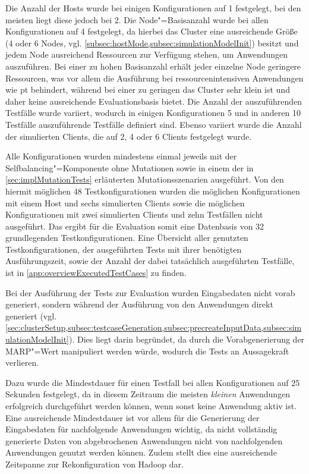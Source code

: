Die Anzahl der Hosts wurde bei einigen Konfigurationen auf 1 festgelegt, bei den meisten liegt diese jedoch bei 2.
Die Node"=Basisanzahl wurde bei allen Konfigurationen auf 4 festgelegt, da hierbei das Cluster eine ausreichende Größe (4 oder 6 Nodes, vgl. \cref{subsec:hostMode,subsec:simulationModelInit}) besitzt und jedem Node ausreichend Ressourcen zur Verfügung stehen, um Anwendungen auszuführen.
Bei einer zu hohen Basisanzahl erhält jeder einzelne Node geringere Ressourcen, was vor allem die Ausführung bei ressourcenintensiven Anwendungen wie \zB \acrlong{pt} behindert, während bei einer zu geringen das Cluster sehr klein ist und daher keine ausreichende Evaluationsbasis bietet.
Die Anzahl der auszuführenden Testfälle wurde variiert, wodurch in einigen Konfigurationen 5 und in anderen 10 Testfälle auszuführende Testfälle definiert sind.
Ebenso variiert wurde die Anzahl der simulierten Clients, die auf 2, 4 oder 6 Clients festgelegt wurde.

Alle Konfigurationen wurden mindestens einmal jeweils mit der Selfbalancing"=Komponente ohne Mutationen sowie in einem der in \cref{sec:implMutationTests} erläuterten Mutationsszenarien ausgeführt.
Von den hiermit möglichen 48 Testkonfigurationen wurden die möglichen Konfigurationen mit einem Host und sechs simulierten Clients sowie die möglichen Konfigurationen mit zwei simulierten Clients und zehn Testfällen nicht ausgeführt.
Das ergibt für die Evaluation somit eine Datenbasis von 32 grundlegenden Testkonfigurationen.
Eine Übersicht aller genutzten Testkonfigurationen, der ausgeführten Tests mit ihrer benötigten Ausführungszeit, sowie der Anzahl der dabei tatsächlich ausgeführten Testfälle, ist in \cref{app:overviewExecutedTestCases} zu finden.

Bei der Ausführung der Tests zur Evaluation wurden Eingabedaten nicht vorab generiert, sondern während der Ausführung von den Anwendungen direkt generiert (vgl. \cref{sec:clusterSetup,subsec:testcaseGeneration,subsec:precreateInputData,subsec:simulationModelInit}).
Dies liegt darin begründet, da durch die Vorabgenerierung der \gls{MARP}"=Wert manipuliert werden würde, wodurch die Tests an Aussagekraft verlieren.

Dazu wurde die Mindestdauer für einen Testfall bei allen Konfigurationen auf 25 Sekunden festgelegt, da in diesem Zeitraum die meisten \emph{kleinen} Anwendungen erfolgreich durchgeführt werden können, wenn sonst keine Anwendung aktiv ist.
Eine ausreichende Mindestdauer ist vor allem für die Generierung der Eingabedaten für nachfolgende Anwendungen wichtig, da nicht vollständig generierte Daten von abgebrochenen Anwendungen nicht von nachfolgenden Anwendungen genutzt werden können.
Zudem stellt dies eine ausreichende Zeitspanne zur Rekonfiguration von Hadoop dar.
